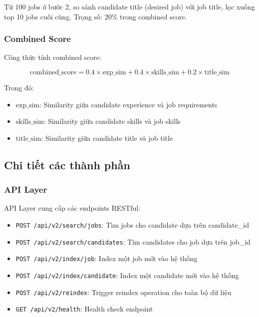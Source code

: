 Từ 100 jobs ở bước 2, so sánh candidate title (desired job) với job title, lọc xuống top 10 jobs cuối cùng. Trọng số: 20\% trong combined score.

\subsubsection{Combined Score}

Công thức tính combined score:

\begin{equation}
\text{combined\_score} = 0.4 \times \text{exp\_sim} + 0.4 \times \text{skills\_sim} + 0.2 \times \text{title\_sim}
\end{equation}

Trong đó:
\begin{itemize}
    \item $\text{exp\_sim}$: Similarity giữa candidate experience và job requirements
    \item $\text{skills\_sim}$: Similarity giữa candidate skills và job skills
    \item $\text{title\_sim}$: Similarity giữa candidate title và job title
\end{itemize}

\subsection{Chi tiết các thành phần}

\subsubsection{API Layer}

API Layer cung cấp các endpoints RESTful:

\begin{itemize}
    \item \texttt{POST /api/v2/search/jobs}: Tìm jobs cho candidate dựa trên candidate\_id
    \item \texttt{POST /api/v2/search/candidates}: Tìm candidates cho job dựa trên job\_id
    \item \texttt{POST /api/v2/index/job}: Index một job mới vào hệ thống
    \item \texttt{POST /api/v2/index/candidate}: Index một candidate mới vào hệ thống
    \item \texttt{POST /api/v2/reindex}: Trigger reindex operation cho toàn bộ dữ liệu
    \item \texttt{GET /api/v2/health}: Health check endpoint
\end{itemize}

